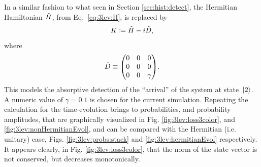 In a similar fashion to what seen in Section \ref{sec:hist:detect},
the Hermitian Hamiltonian $\hat{H}$, from Eq.~\eqref{eq:3lev:H},
is replaced by
\begin{equation}\label{eq:3lev:nonUnitaryH}
  K \coloneqq \hat{H} - i \hat{D} \text{,}
\end{equation}
where
\begin{equation}\label{eq:3lev:nonUnitaryH:antiHermitianTerm}
  \op{D} \repr \mqty(
    0 &0 &0 \\
    0 &0 &0 \\
    0 &0 &\gamma
  ) \text{.}
\end{equation}
This models the absorptive detection of the ``arrival'' of the system at state~$\ket{2}$.
A numeric value of $\gamma = \mathtt{0.1}$ is chosen for the current simulation.
Repeating the calculation for the time-evolution
brings to
probabilities, and probability amplitudes,
that are graphically visualized in Fig. \ref{fig:3lev:loss3color}, and \ref{fig:3lev:nonHermitianEvol},
and can be compared with the Hermitian (i.e. unitary) case,
Figs. \ref{fig:3lev:probs:stack} and \ref{fig:3lev:hermitianEvol} respectively.
It appears clearly, in Fig. \ref{fig:3lev:loss3color},
that the norm of the state vector is not
conserved, but decreases monotonically.
%
